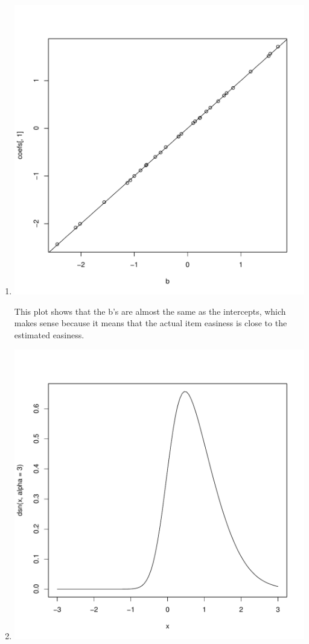 \documentclass{article}\usepackage[]{graphicx}\usepackage[]{color}
\makeatletter
\def\maxwidth{ %
  \ifdim\Gin@nat@width>\linewidth
    \linewidth
  \else
    \Gin@nat@width
  \fi
}
\newenvironment{knitrout}{}{} %
\makeatother
\begin{document}
\begin{enumerate}
\item
\begin{knitrout}
\color{fgcolor}
\includegraphics[width=\maxwidth]{figure/unnamed-chunk-7-1} 

\end{knitrout}
This plot shows that the b's are almost the same as the intercepts, which makes sense because it means that the actual item easiness is close to the estimated easiness.

\item
\begin{knitrout}
\color{fgcolor}
\includegraphics[width=\maxwidth]{figure/unnamed-chunk-8-1} 


\end{knitrout}
\end{enumerate}
\end{document}
